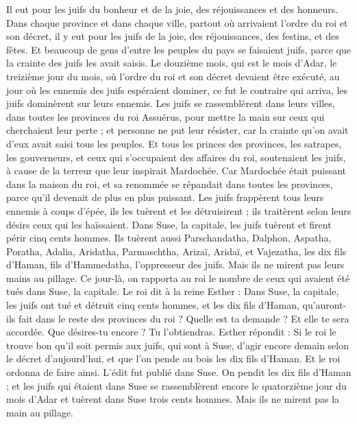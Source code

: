 \begin{multicols}{2}
Il eut pour les juifs du bonheur et de la joie, des réjouissances et des honneurs.
Dans chaque province et dans chaque ville, partout où arrivaient l’ordre du roi et son décret, il y eut pour les juifs de la joie, des réjouissances, des festins, et des fêtes. Et beaucoup de gens d'entre les peuples du pays se faisaient juifs, parce que la crainte des juifs les avait saisis.
\VerseOne{}Le douzième mois, qui est le mois d'Adar, le treizième jour du mois, où l’ordre du roi et son décret devaient être exécuté, au jour où les ennemis des juifs espéraient dominer, ce fut le contraire qui arriva, les juifs dominèrent sur leurs ennemis.
Les juifs se rassemblèrent dans leurs villes, dans toutes les provinces du roi Assuérus, pour mettre la main sur ceux qui cherchaient leur perte ; et personne ne put leur résister, car la crainte qu'on avait d'eux avait saisi tous les peuples.
Et tous les princes des provinces, les satrapes, les gouverneurs, et ceux qui s’occupaient des affaires du roi, soutenaient les juifs, à cause de la terreur que leur inspirait Mardochée.
Car Mardochée était puissant dans la maison du roi, et sa renommée se répandait dans toutes les provinces, parce qu’il devenait de plus en plus puissant.
Les juifs frappèrent tous leurs ennemis à coups d'épée, ils les tuèrent et les détruisirent ; ils traitèrent selon leurs désirs ceux qui les haïssaient.
Dans Suse, la capitale, les juifs tuèrent et firent périr cinq cents hommes.
Ils tuèrent aussi Parschandatha, Dalphon, Aspatha,
Poratha, Adalia, Aridatha,
Parmaschtha, Arizaï, Aridaï, et Vajezatha,
les dix fils d'Haman, fils d'Hammedatha, l'oppresseur des juifs. Mais ils ne mirent pas leurs mains au pillage.
Ce jour-là, on rapporta au roi le nombre de ceux qui avaient été tués dans Suse, la capitale.
Le roi dit à la reine Esther : Dans Suse, la capitale, les juifs ont tué et détruit cinq cents hommes, et les dix fils d'Haman, qu'auront-ils fait dans le reste des provinces du roi ? Quelle est ta demande ? Et elle te sera accordée. Que désires-tu encore ? Tu l’obtiendras.
Esther répondit : Si le roi le trouve bon qu'il soit permis aux juifs, qui sont à Suse, d’agir encore demain selon le décret d’aujourd'hui, et que l'on pende au bois les dix fils d'Haman.
Et le roi ordonna de faire ainsi. L'édit fut publié dans Suse. On pendit les dix fils d'Haman ;
et les juifs qui étaient dans Suse se rassemblèrent encore le quatorzième jour du mois d'Adar et tuèrent dans Suse trois cents hommes. Mais ils ne mirent pas la main au pillage.

\end{multicols}
